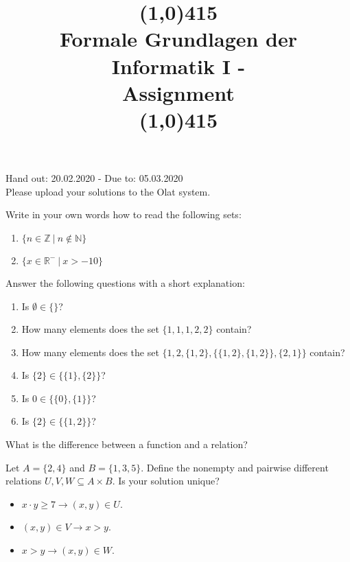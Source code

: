 \documentclass{exercise}
\title{ \line(1,0){415} \\ Formale Grundlagen der Informatik I -\\ Assignment \theexercise\\
\line(1,0){415}}
\begin{document}
\maketitle

\begin{center}
  Hand out: 20.02.2020 - Due to: 05.03.2020\\\vspace{1em}
  Please upload your solutions to the Olat system.\\
\end{center}


   Write in your own words how to read the following sets:
    \begin{enumerate}
      \item $\{ n \in \mathbb{Z} \: | \: n \notin \mathbb{N} \} $

      \item $\{ x \in \mathbb{R}^{-} \: | \: x > -10 \} $

    \end{enumerate}

   Answer the following questions with a short explanation:
    \begin{enumerate}
      \item Is $\emptyset \in \{\} $?
      
      \item How many elements does the set $\{ 1, 1, 1, 2, 2 \} $ contain?
      
      \item How many elements does the set $\{ 1, 2, \{ 1, 2 \}, \{\{1, 2\}, \{1, 2\}\}, \{2, 1\} \}$ contain?
      
      \item Is $\{2\} \in \{ \{ 1 \} , \{ 2 \} \} $?
      
      \item Is $0 \in \{ \{ 0 \} , \{ 1 \} \} $?
      
      \item Is $\{2\} \in \{ \{ 1, 2 \} \} $?

    \end{enumerate}

   What is the difference between a function and a relation?

   Let $A = \{ 2, 4 \} $ and $B = \{ 1, 3, 5 \} $. Define the nonempty and pairwise different relations $U, V, W \subseteq A \times B$. Is your solution unique?
    \begin{itemize}
      \item $x \cdot y \geq 7 \rightarrow (x, y) \in U$.

      \item $(x, y) \in V \rightarrow x > y$.

      \item $x > y \rightarrow (x, y) \in W$.

    \end{itemize}
\end{document}
